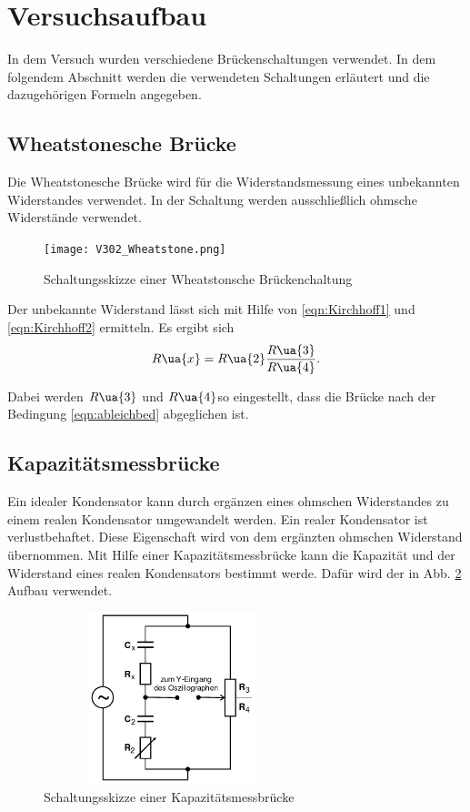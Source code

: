 \section{Versuchsaufbau}

In dem Versuch wurden verschiedene Brückenschaltungen verwendet. In dem folgendem
Abschnitt werden die verwendeten Schaltungen erläutert und die dazugehörigen
Formeln angegeben.

\subsection{Wheatstonesche Brücke}

Die Wheatstonesche Brücke wird für die Widerstandsmessung eines unbekannten
Widerstandes verwendet. In der Schaltung werden ausschließlich ohmsche Widerstände
verwendet.

\begin{figure}
  \texttt{[image: V302\_Wheatstone.png]}
  \caption{Schaltungsskizze einer Wheatstonsche Brückenchaltung}
  \label{fig:Wheatstone}
\end{figure}

Der unbekannte Widerstand lässt sich mit Hilfe von \eqref{eqn:Kirchhoff1} und
\eqref{eqn:Kirchhoff2} ermitteln. Es ergibt sich
\begin{equation}
  \label{eqn:Wheatstone}
  R\ua{x} = R\ua{2}\frac{R\ua{3}}{R\ua{4}}.
\end{equation}

Dabei werden $R\ua{3}$ und $R\ua{4}$so eingestellt, dass die Brücke nach
der Bedingung \eqref{eqn:ableichbed} abgeglichen ist.

\subsection{Kapazitätsmessbrücke}

Ein idealer Kondensator kann durch ergänzen eines ohmschen Widerstandes zu einem
realen Kondensator umgewandelt werden. Ein realer Kondensator ist verlustbehaftet.
Diese Eigenschaft wird von dem ergänzten ohmschen Widerstand übernommen.
Mit Hilfe einer Kapazitätsmessbrücke kann die Kapazität und der Widerstand eines
realen Kondensators bestimmt werde.
Dafür wird der in Abb. \ref{fig:Kapazitätsmessbrücke} Aufbau verwendet.

\begin{figure}
  \includegraphics[width=7.50cm, height=5cm]{V302_Kapazitätsmessbrücke.png}
  \caption{Schaltungsskizze einer Kapazitätsmessbrücke}
  \label{fig:Kapazitätsmessbrücke}
\end{figure}

